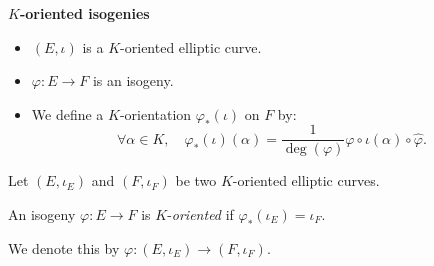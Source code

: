 \documentclass[10pt]{beamer}
\theoremstyle{plain}
\theoremstyle{definition}
\renewcommand{\(}{\left(}
\renewcommand{\)}{\right)}
\begin{document}
\begin{frame}
\textbf{$K$-oriented isogenies}

\vspace{0.5cm}

\begin{itemize}
\item $(E, \iota)$ is a $K$-oriented elliptic curve. 
\item $\varphi : E\longrightarrow F$ is an isogeny.
\item We define a $K$-orientation $\varphi_*(\iota)$ on $F$ by:
\[\forall \alpha\in K,  \quad \varphi_*(\iota)(\alpha)=\frac{1}{\deg(\varphi)}\varphi\circ \iota(\alpha)\circ \widehat{\varphi}.\]
\end{itemize}

\begin{definition}
Let $(E, \iota_E)$ and $(F,\iota_F)$ be two $K$-oriented elliptic curves.  

An isogeny $\varphi : E\longrightarrow F$ is $K$-\emph{oriented} if $\varphi_*(\iota_E)=\iota_F$.  

We denote this by $\varphi : (E, \iota_E)\longrightarrow(F,\iota_F)$.
\end{definition}

\end{frame}
\end{document}
